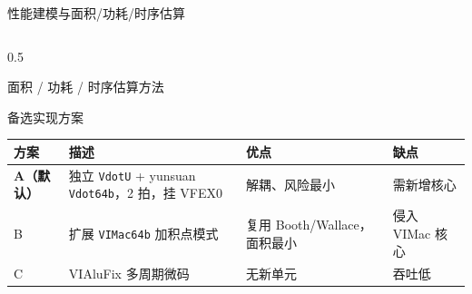 \documentclass[aspectratio=169]{beamer}
\newcommand{\smalltable}[1]{\par\centering\scriptsize #1\par}
\begin{document}
\begin{frame}{性能建模与面积/功耗/时序估算}
\begin{columns}[T]
\begin{column}{0.5\textwidth}
\begin{block}{面积 / 功耗 / 时序估算方法}
\end{block}
\begin{block}{备选实现方案}
\smalltable{%
\begin{tabular}{@{}llll@{}}
\toprule
方案 & 描述 & 优点 & 缺点 \\
\midrule
\textbf{A（默认）} & 独立 \texttt{VdotU} + yunsuan \texttt{Vdot64b}，2 拍，挂 VFEX0 & 解耦、风险最小 & 需新增核心 \\
B & 扩展 \texttt{VIMac64b} 加积点模式 & 复用 Booth/Wallace，面积最小 & 侵入 VIMac 核心 \\
C & VIAluFix 多周期微码 & 无新单元 & 吞吐低 \\
\bottomrule
\end{tabular}}
\end{block}
\end{column}
\end{columns}
\end{frame}
\end{document}
